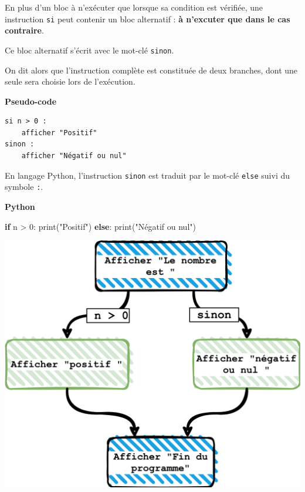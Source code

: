 \documentclass[a4paper,17pt]{extarticle}
\let\origfigure\figure
\let\endorigfigure\endfigure
\renewenvironment{figure}[1][2] {
    \expandafter\origfigure\expandafter[H]
} {
    \endorigfigure
}
\newenvironment{formule}%
{\begin{form}\color{bleuamu}}
{\end{form}}
\newenvironment{Shaded}{}{}
\newcommand{\DecValTok}[1]{\textcolor[rgb]{0.25,0.63,0.44}{{#1}}}
\newcommand{\StringTok}[1]{\textcolor[rgb]{0.25,0.44,0.63}{{#1}}}
\newcommand{\NormalTok}[1]{{#1}}
\newcommand{\ControlFlowTok}[1]{\textcolor[rgb]{0.00,0.44,0.13}{\textbf{{#1}}}}
\newcommand{\OperatorTok}[1]{\textcolor[rgb]{0.40,0.40,0.40}{{#1}}}
\newcommand{\BuiltInTok}[1]{{#1}}
\begin{document}
\begin{formule}
    En plus d'un bloc à n'exécuter que lorsque sa condition est vérifiée,
une instruction \texttt{si} peut contenir un bloc alternatif : \textbf{à
n'excuter que dans le cas contraire}.

Ce bloc alternatif s'écrit avec le mot-clé \texttt{sinon}.

On dit alors que l'instruction complète est constituée de deux branches,
dont une seule sera choisie lors de l'exécution.

        \end{formule}\begin{exemple}
    \textbf{Pseudo-code}

\begin{verbatim}
si n > 0 :
    afficher "Positif"
sinon :
    afficher "Négatif ou nul"
\end{verbatim}

En langage Python, l'instruction \texttt{sinon} est traduit par le
mot-clé \texttt{else} suivi du symbole \texttt{:}.

\textbf{Python}

\begin{Shaded}
\begin{Highlighting}[]
\ControlFlowTok{if}\NormalTok{ n }\OperatorTok{\textgreater{}} \DecValTok{0}\NormalTok{:}
    \BuiltInTok{print}\NormalTok{(}\StringTok{"Positif"}\NormalTok{)}
\ControlFlowTok{else}\NormalTok{:}
    \BuiltInTok{print}\NormalTok{(}\StringTok{"Négatif ou nul"}\NormalTok{)}
\end{Highlighting}
\end{Shaded}

        \end{exemple}
    \begin{figure}
\centering
\includegraphics{res/branche02.png}
\caption{diagramme}
\end{figure}
\end{document}
